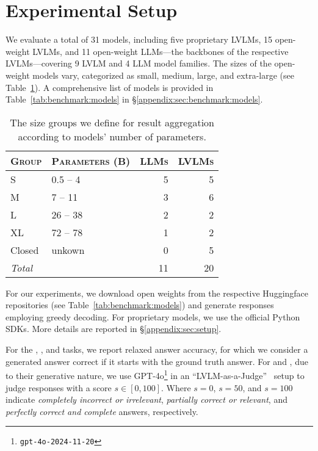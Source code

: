\section{Experimental Setup}
\label{sec:exsetup}
%
\label{sec:benchmark:models}
%
We evaluate a total of 31 models, including five proprietary LVLMs, 15 open-weight LVLMs, and 11 open-weight LLMs---the backbones of the respective LVLMs---covering 9 LVLM and 4 LLM model families.
%
The sizes of the open-weight models vary, categorized as small, medium, large, and extra-large (see Table~\ref{tab:benchmark:model_groups}).
%
A comprehensive list of models is provided in Table~\ref{tab:benchmark:models} in \S\ref{appendix:sec:benchmark:models}.
%
\begin{table}[t]
    \centering
    \footnotesize
    \renewcommand{\arraystretch}{.8}
    \begin{tabular}{l l r r}
        \toprule
        \textsc{Group} & \textsc{Parameters (B)}  & \textsc{LLMs} & \textsc{LVLMs} \\
        \midrule
        S  & 0.5 -- 4 & 5 & 5 \\
        M  & 7 -- 11 & 3 & 6 \\
        L  & 26 -- 38 & 2 & 2 \\
        XL & 72 -- 78 & 1 & 2 \\
        Closed  & unkown & 0 & 5 \\
        \midrule
        \multicolumn{2}{l}{\textit{Total}} & 11 & 20 \\
        \bottomrule
    \end{tabular}
    \caption{The size groups we define for result aggregation according to models' number of parameters.}
    \label{tab:benchmark:model_groups}
\end{table}
%
%
For our experiments, we download open weights from the respective Huggingface~\cite{wolf2019hftransformers} repositories (see Table~\ref{tab:benchmark:models}) and generate responses employing greedy decoding.
%
For proprietary models, we use the official Python SDKs.
%
More details are reported in \S\ref{appendix:sec:setup}.

%
%
For the \sivqa, \vvqa, and \coqa tasks, we report relaxed answer accuracy, for which we consider a generated answer correct if it starts with the ground truth answer.
%
For \ckqad and \ckqan, due to their generative nature, we use GPT-4o\footnote{\texttt{gpt-4o-2024-11-20}} in an ``LVLM-as-a-Judge''~\cite{zheng2023llm-as-a-judge, xiong2024llava-critic} setup to judge responses with a score $s \in [0, 100]$.
%
Where $s=0$, $s=50$, and $s=100$ indicate \textit{completely incorrect or irrelevant}, \textit{partially correct or relevant}, and \textit{perfectly correct and complete} answers, respectively.
%
%

